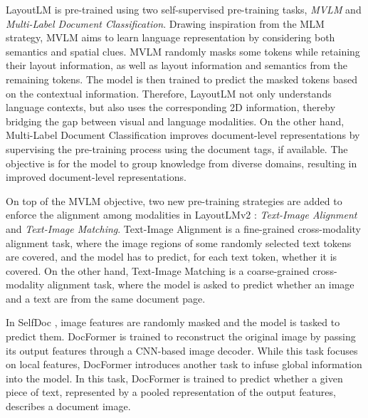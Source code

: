 LayoutLM \citep{xu2020layoutlm} is pre-trained using two self-supervised pre-training tasks, \textit{\ac{MVLM}} and \textit{Multi-Label Document Classification}. Drawing inspiration from the \ac{MLM} strategy, \ac{MVLM} aims to learn language representation by considering both semantics and spatial clues. \ac{MVLM} randomly masks some tokens while retaining their layout information, as well as layout information and semantics from the remaining tokens. The model is then trained to predict the masked tokens based on the contextual information. Therefore, LayoutLM not only understands language contexts, but also uses the corresponding 2D information, thereby bridging the gap between visual and language modalities. On the other hand, Multi-Label Document Classification improves document-level representations by supervising the pre-training process using the document tags, if available. The objective is for the model to group knowledge from diverse domains, resulting in improved document-level representations. 

On top of the \ac{MVLM} objective, two new pre-training strategies are added to enforce the alignment among modalities in LayoutLMv2 \citep{xu2020layoutlmv2}: \textit{Text-Image Alignment} and \textit{Text-Image Matching}. Text-Image Alignment is a fine-grained cross-modality alignment task, where the image regions of some randomly selected text tokens are covered, and the model has to predict, for each text token, whether it is covered. On the other hand, Text-Image Matching is a coarse-grained cross-modality alignment task, where the model is asked to predict whether an image and a text are from the same document page. 

In SelfDoc \citep{li2021selfdoc}, image features are randomly masked and the model is tasked to predict them. DocFormer \citep{appalaraju2021docformer} is trained to reconstruct the original image by passing its output features through a \ac{CNN}-based image decoder. While this task focuses on local features, DocFormer introduces another task to infuse global information into the model. In this task, DocFormer is trained to predict whether a given piece of text, represented by a pooled representation of the output features, describes a document image. 

